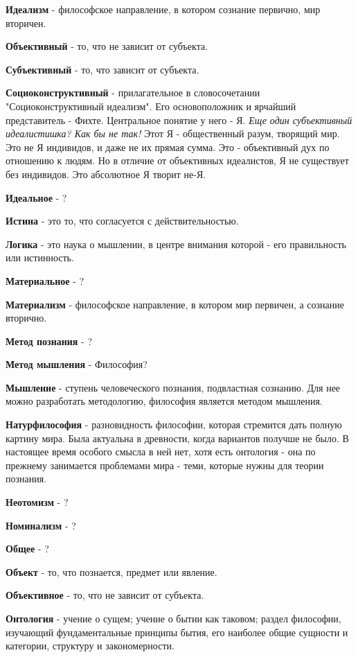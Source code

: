 \documentclass[12pt,a4paper]{article}
\begin{document}
\textbf{Идеализм} - философское направление, в котором сознание первично, мир вторичен.

\textbf{Объективный} - то, что не зависит от субъекта.

\textbf{Субъективный} - то, что зависит от субъекта.

\textbf{Социоконструктивный} - прилагательное в словосочетании "Социоконструктивный идеализм". Его основоположник и ярчайший представитель - Фихте. Центральное понятие у него - Я. \textit{Еще один субъективный идеалистишка? Как бы не так!} Этот Я - общественный разум, творящий мир. Это не Я индивидов, и даже не их прямая сумма. Это - объективный дух по отношению к людям. Но в отличие от объективных идеалистов, Я не существует без индивидов. Это абсолютное Я творит не-Я.

\textbf{Идеальное} - ?

\textbf{Истина} - это то, что согласуется с действительностью.

\textbf{Логика} - это наука о мышлении, в центре внимания которой - его правильность или истинность.

\textbf{Материальное} - ?

\textbf{Материализм} - философское направление, в котором мир первичен, а сознание вторично.

\textbf{Метод познания} - ?

\textbf{Метод мышления} - Философия?

\textbf{Мышление} - ступень человеческого познания, подвластная сознанию. Для нее можно разработать методологию, философия является методом мышления.

\textbf{Натурфилософия} - разновидность философии, которая стремится дать полную картину мира. Была актуальна в древности, когда вариантов получше не было. В настоящее время особого смысла в ней нет, хотя есть онтология - она по прежнему занимается проблемами мира - теми, которые нужны для теории познания.

\textbf{Неотомизм} - ?

\textbf{Номинализм} - ?

\textbf{Общее} - ?

\textbf{Объект} - то, что познается, предмет или явление.

\textbf{Объективное} - то, что не зависит от субъекта.

\textbf{Онтология} - учение о сущем; учение о бытии как таковом; раздел философии, изучающий фундаментальные принципы бытия, его наиболее общие сущности и категории, структуру и закономерности.
\end{document}

